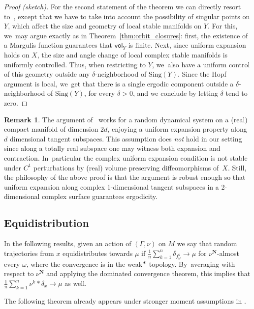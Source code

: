 \documentclass[11pt]{article}
\newcommand{\unsur}[1]{\frac{1}{#1}}
\def\N{\mathbf{N}}
\newcommand{\vol}{{\mathsf{vol}}}
\theoremstyle{plain}
\theoremstyle{definition}
\newtheorem{rem}[thm]{Remark}
\numberwithin{equation}{section}
\begin{document}
\begin{proof}[Proof (sketch)]
For the second statement of the theorem we can directly resort to~\cite{liu_thesis, chung}, except that
we have to take into account the possibility of singular points on $Y$, which affect the size and geometry of local stable manifolds on $Y$. For this, we~may argue exactly as in Theorem~\ref{thm:orbit_closures}:
first, the existence of a Margulis function guarantees that $\vol_Y$ is finite. Next, since
uniform expansion holds on $X$, the size and angle change of local complex stable manifolds is uniformly controlled. Thus, when restricting to $Y$, we~also have a uniform control of this geometry outside any
$\delta$-neighborhood of $\mathrm{Sing}(Y)$. Since the Hopf argument is local, we~get that there is a single
ergodic component outside a $\delta$-neighborhood of $\mathrm{Sing}(Y)$, for every $\delta>0$, and we conclude by letting $\delta$ tend to zero.
\end{proof}

\begin{rem}
The argument of~\cite{dolgopyat-krikorian} works for a random dynamical system on a (real) compact
manifold of dimension $2d$, enjoying a uniform expansion property
along $d$ dimensional tangent subspaces. This assumption
does \emph{not} hold in our setting since along a totally real subspace one
may witness both expansion and
contraction. In~particular the complex uniform expansion condition is not stable under
$C^1$ perturbations by (real) volume preserving diffeomorphisms of~$X$.
Still, the philosophy of the above proof is that
the argument is robust enough so that uniform expansion along complex 1-dimensional
tangent subspaces in a 2-dimensional complex surface guarantees ergodicity.
\end{rem}

\subsection{Equidistribution}

In the following results, given an action of $(\Gamma, \nu)$ on $M$
we say
that random trajectories from $x$ equidistributes towards
$\mu$ if
$\unsur{n}\sum_{k=1}^n \delta_{f^k_\omega} \to \mu$ for $\nu^\N$-almost every
$\omega$, where the convergence is in the
weak$^\varstar$ topology. By~averaging with respect to $\nu^\N$ and applying
the dominated convergence theorem, this implies that
$\unsur{n}\sum_{k=1}^n \nu^k\ast\delta_x\to\mu$ as well.

The following theorem already appears under stronger moment assumptions in \cite[Th.\,D]{chung}.
\end{document}
